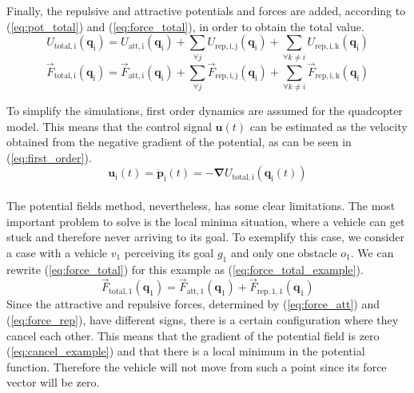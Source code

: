 \documentclass[journal]{IEEEtran}
\newcommand*{\subb}[1]{_{\mathrm{#1}}}
\begin{document}
		Finally, the repulsive and attractive potentials and forces are added, according to (\ref{eq:pot_total}) and (\ref{eq:force_total}), in order to obtain the total value. 
		\begin{equation} \label{eq:pot_total}
		U\subb{total, i}(\bm{q}\subb{i}) = U\subb{att, i}(\bm{q}\subb{i}) + \sum \limits_{\forall j}U\subb{rep,i,j}(\bm{q}\subb{i}) + \sum \limits_{\forall k \neq i}U\subb{rep,i,k}(\bm{q}\subb{i}) 
		\end{equation}
		\begin{equation} \label{eq:force_total}
		\vec{F}\subb{total, i}(\bm{q}\subb{i}) = \vec{F}\subb{att,i}(\bm{q}\subb{i}) + \sum\limits_{\forall j} \vec{F}\subb{rep,i,j}(\bm{q}\subb{i}) + \sum\limits_{\forall k \neq i} \vec{F}\subb{rep,i,k}(\bm{q}\subb{i})
		\end{equation}
		
		
		To simplify the simulations, first order dynamics are assumed for the quadcopter model. This means that the control signal $\bm{u}(t)$ can be estimated as the velocity obtained from the negative gradient of the potential, as can be seen in (\ref{eq:first_order}).
		\begin{equation} \label{eq:first_order}
		\bm{u}\subb{i}(t) = \bm{\dot p}\subb{i}(t) = -\bm{\nabla}U\subb{total, i}(\bm{q}\subb{i}(t))
		\end{equation}
		\\
		The potential fields method, nevertheless, has some clear limitations. The most important problem to solve is the local minima situation, where a vehicle can get stuck and therefore never arriving to its goal. To exemplify this case, we consider a case with a vehicle  $v\subb{1}$ perceiving its goal $g\subb{1}$ and only one obstacle $o\subb{1}$. We can rewrite (\ref{eq:force_total}) for this example as (\ref{eq:force_total_example}).
		\begin{equation} \label{eq:force_total_example}
			\vec{F}\subb{total, 1}(\bm{q}\subb{1}) = \vec{F}\subb{att,1}(\bm{q}\subb{1}) + \vec{F}\subb{rep,1,1}(\bm{q}\subb{1})
		\end{equation}
		Since the attractive and repulsive forces, determined by (\ref{eq:force_att}) and (\ref{eq:force_rep}), have different signs, there is a certain configuration where they cancel each other. This means that the gradient of the potential field is zero (\ref{eq:cancel_example}) and that there is a local minimum in the potential function. Therefore the vehicle will not move from such a point since its force vector will be zero.
	
\end{document}
